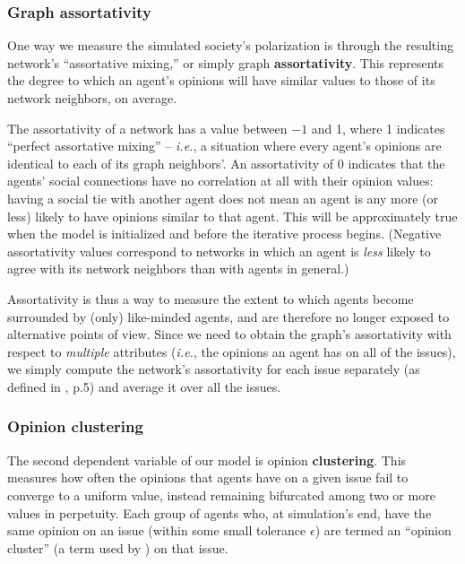 \subsubsection{Graph assortativity}

One way we measure the simulated society's polarization is through the
resulting network's ``assortative mixing,'' or simply graph
\textbf{assortativity}. This represents the degree to which an agent's opinions
will have similar values to those of its network neighbors, on average.

The assortativity of a network has a value between $-1$ and 1, where 1
indicates ``perfect assortative mixing'' -- \textit{i.e.}, a situation where
every agent's opinions are identical to each of its graph neighbors'. An
assortativity of 0 indicates that the agents' social connections have no
correlation at all with their opinion values: having a social tie with another
agent does not mean an agent is any more (or less) likely to have opinions
similar to that agent. This will be approximately true when the model is
initialized and before the iterative process begins. (Negative assortativity
values correspond to networks in which an agent is \textit{less} likely to
agree with its network neighbors than with agents in general.)

Assortativity is thus a way to measure the extent to which agents become
surrounded by (only) like-minded agents, and are therefore no longer exposed to
alternative points of view. Since we need to obtain the graph's assortativity
with respect to \textit{multiple} attributes (\textit{i.e.}, the opinions an
agent has on all of the issues), we simply compute the network's assortativity
for each issue separately (as defined in \cite{newman_mixing_2003}, p.5) and
average it over all the issues.

\subsubsection{Opinion clustering}

The second dependent variable of our model is opinion \textbf{clustering}. This
measures how often the opinions that agents have on a given issue fail to
converge to a uniform value, instead remaining bifurcated among two or more
values in perpetuity. Each group of agents who, at simulation's end, have the
same opinion on an issue (within some small tolerance $\epsilon$) are termed an
``opinion cluster'' (a term used by \cite{fotakis_opinion_2016}) on that issue.

